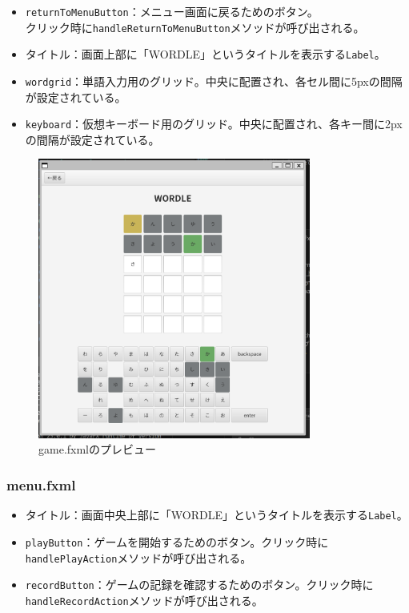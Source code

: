 \documentclass[a4j]{ujarticle}
\begin{document}
\begin{itemize}
  \item \texttt{returnToMenuButton}：メニュー画面に戻るためのボタン。\\
  クリック時に\texttt{handleReturnToMenuButton}メソッドが呼び出される。
  \item タイトル：画面上部に「WORDLE」というタイトルを表示する\texttt{Label}。
  \item \texttt{wordgrid}：単語入力用のグリッド。中央に配置され、各セル間に5pxの間隔が設定されている。
  \item \texttt{keyboard}：仮想キーボード用のグリッド。中央に配置され、各キー間に2pxの間隔が設定されている。
\end{itemize}

\begin{figure}[h]
\centering
\includegraphics[width=0.8\textwidth]{game_preview.png}
\caption{game.fxmlのプレビュー}
\label{fig:game_fxml}
\end{figure}

\subsubsection{menu.fxml}
\begin{itemize}
  \item タイトル：画面中央上部に「WORDLE」というタイトルを表示する\texttt{Label}。
  \item \texttt{playButton}：ゲームを開始するためのボタン。クリック時に\texttt{handlePlayAction}メソッドが呼び出される。
  \item \texttt{recordButton}：ゲームの記録を確認するためのボタン。クリック時に\texttt{handleRecordAction}メソッドが呼び出される。
\end{itemize}
\end{document}

